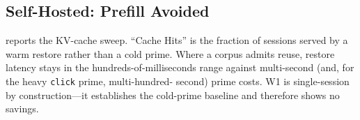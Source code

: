 \documentclass[10pt]{article}
\begin{document}
\subsection{Self-Hosted: Prefill Avoided}
 reports the KV-cache sweep. ``Cache Hits'' is the fraction of
sessions served by a warm restore rather than a cold prime. Where a corpus
admits reuse, restore latency stays in the hundreds-of-milliseconds range
against multi-second (and, for the heavy \texttt{click} prime, multi-hundred-
second) prime costs. W1 is single-session by construction---it establishes the
cold-prime baseline and therefore shows no savings.

\begin{table}[t]
\centering
\caption{Self-hosted KV-cache engine, latest run per workload (Qwen3-8B,
\num{8192} ctx). Each row is the most recent \texttt{W*\_local\_*.json} under
\texttt{experiments/results/}. TFLOPs avoided combines the
$2\times\text{params}\times\text{tokens}$ floor with the quadratic
self-attention term.}
\label{tab:local}
\small
{}
\end{table}
\end{document}
